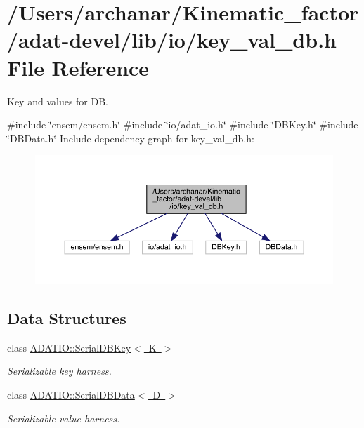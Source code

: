 \hypertarget{adat-devel_2lib_2io_2key__val__db_8h}{}\section{/\+Users/archanar/\+Kinematic\+\_\+factor/adat-\/devel/lib/io/key\+\_\+val\+\_\+db.h File Reference}
\label{adat-devel_2lib_2io_2key__val__db_8h}


Key and values for DB.  


{\ttfamily \#include \char`\"{}ensem/ensem.\+h\char`\"{}}\newline
{\ttfamily \#include \char`\"{}io/adat\+\_\+io.\+h\char`\"{}}\newline
{\ttfamily \#include \char`\"{}D\+B\+Key.\+h\char`\"{}}\newline
{\ttfamily \#include \char`\"{}D\+B\+Data.\+h\char`\"{}}\newline
Include dependency graph for key\+\_\+val\+\_\+db.\+h\+:
\nopagebreak
\begin{figure}[H]
\begin{center}
\leavevmode
\includegraphics[width=350pt]{dd/d8e/adat-devel_2lib_2io_2key__val__db_8h__incl}
\end{center}
\end{figure}
\subsection*{Data Structures}
\begin{DoxyCompactItemize}
\item 
class \mbox{\hyperlink{classADATIO_1_1SerialDBKey}{A\+D\+A\+T\+I\+O\+::\+Serial\+D\+B\+Key$<$ K $>$}}
\begin{DoxyCompactList}\small\item\em Serializable key harness. \end{DoxyCompactList}\item 
class \mbox{\hyperlink{classADATIO_1_1SerialDBData}{A\+D\+A\+T\+I\+O\+::\+Serial\+D\+B\+Data$<$ D $>$}}
\begin{DoxyCompactList}\small\item\em Serializable value harness. \end{DoxyCompactList}\end{DoxyCompactItemize}
